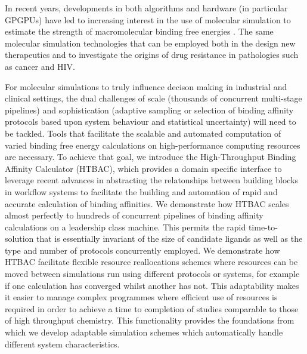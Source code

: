 In recent years, developments in both algorithms and hardware (in particular 
GPGPUs) have led to increasing interest in the use of molecular simulation to 
estimate the strength of macromolecular binding free energies \cite{DeVivo2016}. 
The same molecular simulation technologies that can be employed both in the
design new therapeutics and to investigate the origins of drug resistance in 
pathologies such as cancer and HIV. 

For molecular simulations to truly influence decison making in industrial and 
clinical settings, the dual challenges of scale (thousands of concurrent 
multi-stage pipelines) and sophistication (adaptive sampling or selection of 
binding affinity protocols based upon system behaviour and statistical 
uncertainty) will need to be tackled. 
Tools that facilitate the scalable and automated computation of varied binding 
free energy calculations on high-performance computing resources are necessary. 
To achieve that goal, we introduce the High-Throughput Binding Affinity Calculator 
(HTBAC), which provides a domain specific interface to leverage recent advances in abstracting 
the relatonships between building blocks in workflow systems to facilitate the building 
and automation of rapid and accurate calculation of binding affinities.
We demonstrate how HTBAC scales almost perfectly to hundreds of concurrent
pipelines of binding affinity calculations on a leadership class machine. 
This permits the rapid time-to-solution that is essentially invariant of the size
of candidate ligands as well as the type and number of protocols concurrently
employed.
We demonstrate how HTBAC facilitate flexible resource reallocations schemes where 
resources can be moved between simulations run using different protocols or systems, 
for example if one calculation has converged whilst another has not.
This adaptability makes it easier to manage complex programmes where efficient use of 
resources is required in order to achieve a time to completion of studies comparable 
to those of high throughput chemistry.
This functionality provides the foundations from which we develop adaptable simulation
schemes which automatically handle different system characteristics.

